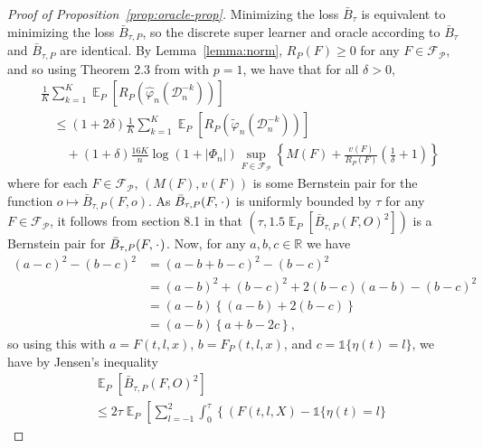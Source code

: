 \documentclass[alpha-refs]{wiley-article}
\DeclareMathOperator{\E}{\mathbb{E}} %
\newcommand{\R}{\mathbb{R}}
\newcommand{\blank}{\makebox[1ex]{\textbf{$\cdot$}}}
\renewcommand{\phi}{\varphi}
\newcommand{\1}{\mathbb{1}} %
\newcommand{\data}{\ensuremath{\mathcal{D}}}
\providecommand{\DIFaddbegin}{} %
\providecommand{\DIFaddend}{} %
\providecommand{\DIFdelbegin}{} %
\providecommand{\DIFdelend}{} %
\begin{document}
\DIFdelbegin %
\DIFdelend \DIFaddbegin \begin{proof}[Proof of Proposition~\ref{prop:oracle-prop}]
  \DIFaddend Minimizing the loss \( \bar{B}_{\tau} \) is equivalent to
  minimizing the loss \( \bar{B}_{\tau,P} \), so the discrete super learner and
  oracle according to \( \bar{B}_{\tau} \) and \( \bar{B}_{\tau,P} \) are
  identical. By Lemma~\ref{lemma:norm}, \( R_P(F) \geq 0 \) for any
  \( F \in \mathcal{F}_{\mathcal{P}} \), and so using Theorem 2.3 from
  \citep{vaart2006oracle} with \( p=1 \), we have that for all \( \delta >0 \),
\begin{align*}
  & \frac{1}{K} \sum_{k=1}^{K} \E_{P}{\left[ R_P(\hat{\phi}_n(\data_n^{-k})) \right]}
  \\
  &  \quad \leq
    (1+2\delta)\frac{1}{K} \sum_{k=1}^{K}\E_{P}{\left[ R_P(\tilde{\phi}_n(\data_n^{-k})) \right]}
  \\
  & \qquad + (1+\delta) \frac{16 K}{n}
    \log(1 + |\Phi_n|)\sup_{F \in \mathcal{F}_{\mathcal{P}}}
    \left\{
    M(F) + \frac{v(F)}{R_P(F)}
    \left(
    \frac{1}{\delta} + 1
    \right)
    \right\}
\end{align*}
where for each \( F \in \mathcal{F}_{\mathcal{P}} \),
\( (M(F), v(F)) \) is some Bernstein pair for the function
\(o \mapsto \bar{B}_{\tau,P}(F, o) \). As
\( \bar{B}_{\tau,P}(F, \blank) \) is uniformly bounded by \( \tau \)
for any \( F \in \mathcal{F}_{\mathcal{P}} \), it follows from section
8.1 in \citep{vaart2006oracle} that
\( (\tau, 1.5 \E_P{[\bar{B}_{\tau,P}(F, O)^2]}) \) is a Bernstein
pair for \( \bar{B}_{\tau,P}(F, \blank) \). Now, for any
\( a,b,c \in \R \) we have
\begin{align*}
  (a-c)^2 - (b-c)^2
  & = (a-b+b-c)^2 - (b-c)^2
  \\
  & = (a-b)^2 + (b-c)^2 +2(b-c)(a-b) - (b-c)^2
  \\
  & = (a-b)
    \left\{
    (a-b) +  2(b-c)
    \right\}
  \\
  & = (a-b)
    \left\{
     a + b -2c
    \right\},
\end{align*}
so using this with \( a=F(t, l, x) \), \( b=F_P(t, l, x) \), and
\( c = \1{\{\eta(t) = l\}} \), we have by Jensen's inequality
\begin{align*}
  & \E_P{[\bar{B}_{\tau,P}(F, O)^2]}
  \\
  & \leq
    2\tau\E_{P}{\left[
    \sum_{l=-1}^{2} \int_0^{\tau}
    \left\{
    \left(
    F(t, l, X) - \1{\{\eta(t) = l\}}
}
\end{align*}
\end{proof}
\end{document}

